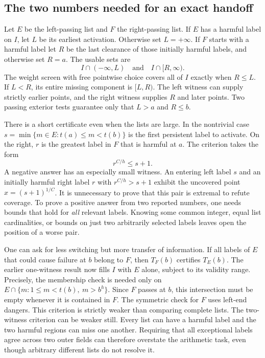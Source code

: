 \documentclass[12pt,letterpaper]{article}
\begin{document}
\subsection{The two numbers needed for an exact handoff}
Let \(E\) be the left-passing list and \(F\) the right-passing list. If \(E\) has a harmful label on \(I\), let \(L\) be its earliest activation. Otherwise set \(L=+\infty\). If \(F\) starts with a harmful label let \(R\) be the last clearance of those initially harmful labels, and otherwise set \(R=a\). The usable sets are
\[
             I\cap(-\infty,L)\quad\text{and}\quad I\cap[R,\infty).
\]
The weight screen with free pointwise choice covers all of \(I\) exactly when \(R\le L\). If \(L<R\), its entire missing component is \([L,R)\). The left witness can supply strictly earlier points, and the right witness supplies \(R\) and later points. Two passing exterior tests guarantee only that \(L>a\) and \(R\le b\).

There is a short certificate even when the lists are large. In the nontrivial case \(s=\min\{m\in E:t(a)\le m<t(b)\}\) is the first persistent label to activate. On the right, \(r\) is the greatest label in \(F\) that is harmful at \(a\). The criterion takes the form
\begin{equation}
                 r^{C/h}\le s+1 .
                 \label{eq:stitch-extrema}
\end{equation}
A negative answer has an especially small witness. An entering left label \(s\) and an initially harmful right label \(r\) with \(r^{C/h}>s+1\) exhibit the uncovered point \(x=(s+1)^{1/C}\). It is unnecessary to prove that this pair is extremal to refute coverage. To prove a positive answer from two reported numbers, one needs bounds that hold for \emph{all} relevant labels. Knowing some common integer, equal list cardinalities, or bounds on just two arbitrarily selected labels leaves open the position of a worse pair.

One can ask for less switching but more transfer of information. If all labels of \(E\) that could cause failure at \(b\) belong to \(F\), then \(T_F(b)\) certifies \(T_E(b)\). The earlier one-witness result now fills \(I\) with \(E\) alone, subject to its validity range. Precisely, the membership check is needed only on \(E\cap\{m:1\le m<t(b),\ m>b^h\}\). Since \(F\) passes at \(b\), this intersection must be empty whenever it is contained in \(F\). The symmetric check for \(F\) uses left-end dangers. This criterion is strictly weaker than comparing complete lists. The two-witness criterion can be weaker still. Every list can have a harmful label and the two harmful regions can miss one another. Requiring that all exceptional labels agree across two outer fields can therefore overstate the arithmetic task, even though arbitrary different lists do not resolve it.
\end{document}
